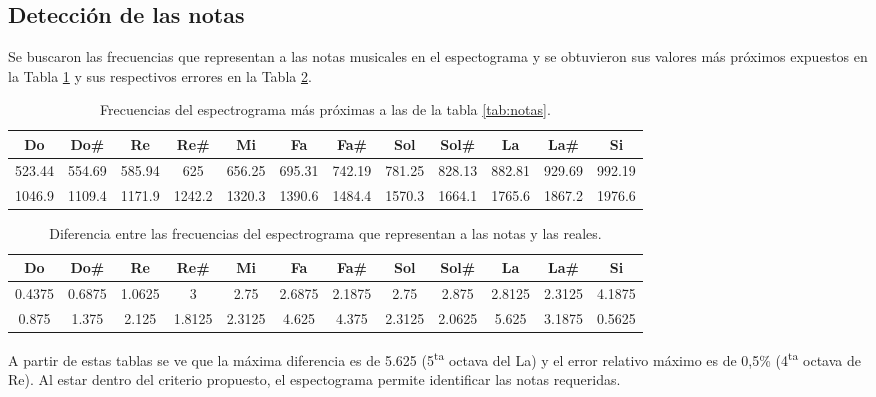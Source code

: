 	\subsection{Detección de las notas}
		Se buscaron las frecuencias que representan a las notas musicales en el espectograma y se obtuvieron sus valores más próximos expuestos en la Tabla \ref{tab:comparativa1} y sus respectivos errores en la Tabla \ref{tab:comparativa2}.

	\begin{table}[H]
		\centering
		\begin{tabular}{*{12}{c}}
			\toprule
			Do&Do\# &Re&Re\# &Mi&Fa&Fa\# &Sol&Sol\# &La&La\# &Si\\
			\midrule
			\num{523.44}&\num{554.69}&\num{585.94}&\num{625}&\num{656.25}&\num{695.31}&\num{742.19}&\num{781.25}&\num{828.13}&\num{882.81}&\num{929.69}&\num{992.19}\\
			\num{1046.9}&\num{1109.4}&\num{1171.9}&\num{1242.2}&\num{1320.3}&\num{1390.6}&\num{1484.4}&\num{1570.3}&\num{1664.1}&\num{1765.6}&\num{1867.2}&\num{1976.6}\\
			\bottomrule
		\end{tabular}
		\caption{Frecuencias del espectrograma más próximas a las de la tabla \ref{tab:notas}.}
		\label{tab:comparativa1}
	\end{table}

	\begin{table}[H]
		\centering
		\begin{tabular}{*{12}{c}}
			\toprule
			Do&Do\# &Re&Re\# &Mi&Fa&Fa\# &Sol&Sol\# &La&La\# &Si\\
			\midrule
			\num{0.4375}&\num{0.6875}&\num{1.0625}&\num{3}&\num{2.75}&\num{2.6875}&\num{2.1875}&\num{2.75}&\num{2.875}&\num{2.8125}&\num{2.3125}&\num{4.1875}\\
			\num{0.875}&\num{1.375}&\num{2.125}&\num{1.8125}&\num{2.3125}&\num{4.625}&\num{4.375}&\num{2.3125}&\num{2.0625}&\num{5.625}&\num{3.1875}&\num{0.5625}\\
			\bottomrule
		\end{tabular}
		\caption{Diferencia entre las frecuencias del espectrograma que representan a las notas y las reales.}
		\label{tab:comparativa2}
	\end{table}

	A partir de estas tablas se ve que la máxima diferencia es de \num{5.625} (5\textsuperscript{ta} octava del La) y el error relativo máximo es de 0,5\% (4\textsuperscript{ta} octava de Re). Al estar dentro del criterio propuesto, el espectograma permite identificar las notas requeridas.

